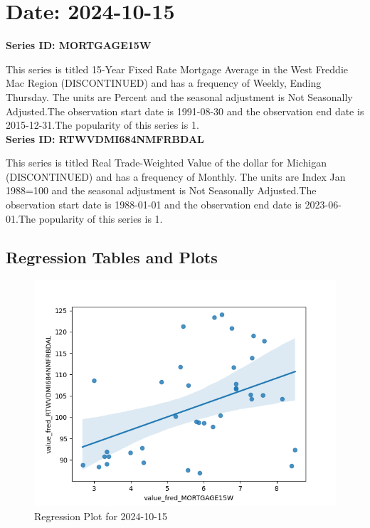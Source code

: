 \section{Date: 2024-10-15}
\noindent \textbf{Series ID: MORTGAGE15W} 

\noindent This series is titled 15-Year Fixed Rate Mortgage Average in the West Freddie Mac Region (DISCONTINUED) and has a frequency of Weekly, Ending Thursday. The units are Percent and the seasonal adjustment is Not Seasonally Adjusted.The observation start date is 1991-08-30 and the observation end date is 2015-12-31.The popularity of this series is 1. \\ 

\noindent \textbf{Series ID: RTWVDMI684NMFRBDAL} 

\noindent This series is titled Real Trade-Weighted Value of the dollar for Michigan (DISCONTINUED) and has a frequency of Monthly. The units are Index Jan 1988=100 and the seasonal adjustment is Not Seasonally Adjusted.The observation start date is 1988-01-01 and the observation end date is 2023-06-01.The popularity of this series is 1. \\ 

\subsection{Regression Tables and Plots}


\begin{figure}
\centering
\includegraphics[scale = 0.9]{plots/plot_2024-10-15.png}
\caption{Regression Plot for 2024-10-15}
\end{figure}
\newpage
